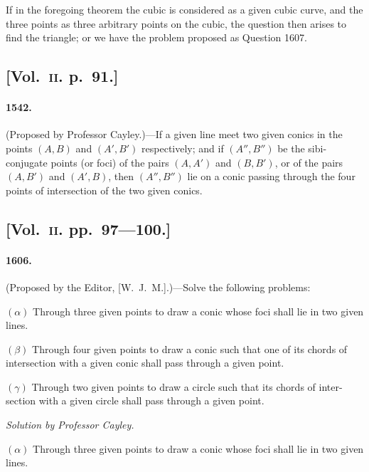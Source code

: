 \documentclass[11pt,a4paper]{article}
\begin{document}
If in the foregoing theorem the cubic is considered as a given cubic curve, and
the three points as three arbitrary points on the cubic, the question then arises to
find the triangle; or we have the problem proposed as Question 1607.

\subsection*{[Vol.~\textsc{ii}. p.\ 91.]}

\paragraph*{1542.} (Proposed by Professor Cayley.)---If a given line meet two given conics
in the points $(A, B)$ and $(A', B')$ respectively; and if $(A'', B'')$ be the sibi-conjugate
points (or foci) of the pairs $(A, A')$ and $(B, B')$, or of the pairs $(A, B')$ and $(A', B)$,
then $(A'', B'')$ lie on a conic passing through the four points of intersection of the
two given conics.

\subsection*{[Vol.~\textsc{ii}. pp.\ 97---100.]}

\paragraph*{1606.} (Proposed by the Editor, [W.~J.~M.].)---Solve the following problems:

$(\alpha)$ Through three given points to draw a conic whose foci shall lie in two given
lines.

$(\beta)$ Through four given points to draw a conic such that one of its chords of
intersection with a given conic shall pass through a given point.

$(\gamma)$ Through two given points to draw a circle such that its chords of inter-
section with a given circle shall pass through a given point.

\begin{center}
\textit{Solution by Professor Cayley.}
\end{center}

$(\alpha)$ Through three given points to draw a conic whose foci shall lie in two given
lines.
\end{document}
